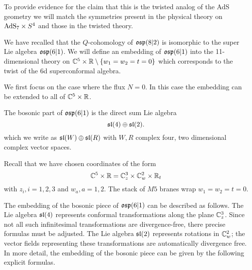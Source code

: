 \parsec[s:m5embedding]

To provide evidence for the claim that this is the twisted analog of the AdS geometry we will match the symmetries present in the physical theory on ${\rm AdS}_7 \times S^4$ and those in the twisted theory. 

We have recalled that the $Q$-cohomology of $\mathfrak{osp}(8|2)$ is isomorphic to the super Lie algebra $\mathfrak{osp}(6|1)$. 
We will define an embedding of $\mathfrak{osp}(6|1)$ into the 11-dimensional theory on $\mathbb C^5 \times \mathbb R \setminus \{w_1=w_2=t=0\}$ which corresponds to the twist of the 6d superconformal algebra.

We first focus on the case where the flux $N=0$.
In this case the embedding can be extended to all of $\mathbb C^5 \times \mathbb R$. 

The bosonic part of $\mathfrak{osp}(6|1)$ is the direct sum Lie algebra
\[
\mathfrak{sl}(4) \oplus \mathfrak{sl}(2) .
\]
which we write as $\mathfrak{sl}(W) \oplus \mathfrak{sl}(R)$ with $W,R$ complex four, two dimensional complex vector spaces. 

Recall that we have chosen coordinates of the form
\[
\mathbb C^5 \times \mathbb R = \mathbb C_z^3 \times \mathbb C_w^2 \times \mathbb R_t
\]
with $z_i, i=1,2,3$ and $w_a, a=1,2$.
The stack of $M5$ branes wrap $w_1=w_2=t=0$. 

The embedding of the bosonic piece of $\mathfrak{osp}(6|1)$ can be described as follows. 
The Lie algebra $\mathfrak{sl}(4)$ represents conformal transformations along the plane $\mathbb C^3_z$.
Since not all such infinitesimal transformations are divergence-free, there precise formulas must be adjusted.   
The Lie algebra $\mathfrak{sl}(2)$ represents rotations in $\mathbb C^2_w$; the vector fields representing these transformations are automatically divergence free.
In more detail, the embedding of the bosonic piece can be given by the following explicit formulas. 

